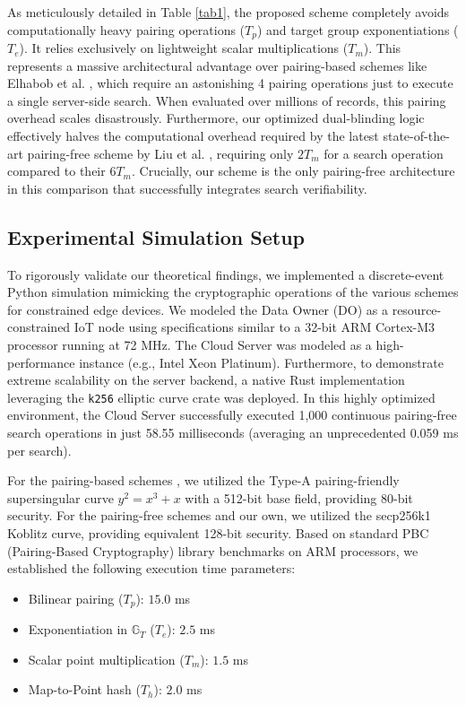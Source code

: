 \documentclass[10pt,journal,compsoc]{IEEEtran}
\begin{document}
As meticulously detailed in Table \ref{tab1}, the proposed scheme completely avoids computationally heavy pairing operations ($T_p$) and target group exponentiations ($T_e$). It relies exclusively on lightweight scalar multiplications ($T_m$). This represents a massive architectural advantage over pairing-based schemes like Elhabob et al. \cite{elhabob2020efficient}, which require an astonishing 4 pairing operations just to execute a single server-side search. When evaluated over millions of records, this pairing overhead scales disastrously. Furthermore, our optimized dual-blinding logic effectively halves the computational overhead required by the latest state-of-the-art pairing-free scheme by Liu et al. \cite{liu2023pairing}, requiring only $2 T_m$ for a search operation compared to their $6 T_m$. Crucially, our scheme is the only pairing-free architecture in this comparison that successfully integrates search verifiability. 

\subsection{Experimental Simulation Setup}
To rigorously validate our theoretical findings, we implemented a discrete-event Python simulation mimicking the cryptographic operations of the various schemes for constrained edge devices. We modeled the Data Owner (DO) as a resource-constrained IoT node using specifications similar to a 32-bit ARM Cortex-M3 processor running at 72 MHz. The Cloud Server was modeled as a high-performance instance (e.g., Intel Xeon Platinum). Furthermore, to demonstrate extreme scalability on the server backend, a native Rust implementation leveraging the \texttt{k256} elliptic curve crate was deployed. In this highly optimized environment, the Cloud Server successfully executed 1,000 continuous pairing-free search operations in just 58.55 milliseconds (averaging an unprecedented 0.059 ms per search).

For the pairing-based schemes \cite{lu2023certificateless, elhabob2020efficient}, we utilized the Type-A pairing-friendly supersingular curve $y^2 = x^3 + x$ with a 512-bit base field, providing 80-bit security. For the pairing-free schemes \cite{liu2023pairing} and our own, we utilized the secp256k1 Koblitz curve, providing equivalent 128-bit security. Based on standard PBC (Pairing-Based Cryptography) library benchmarks on ARM processors, we established the following execution time parameters:
\begin{itemize}
    \item Bilinear pairing ($T_p$): $15.0$ ms
    \item Exponentiation in $\mathbb{G}_T$ ($T_e$): $2.5$ ms
    \item Scalar point multiplication ($T_m$): $1.5$ ms
    \item Map-to-Point hash ($T_h$): $2.0$ ms
\end{itemize}
\end{document}
